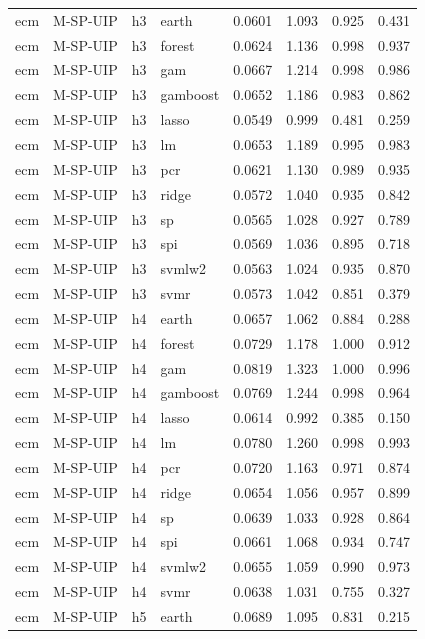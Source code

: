 \begin{ThreePartTable}
\begin{longtable}[t]{llclcccc}
\addlinespace
ecm & M-SP-UIP & h3 & earth & 0.0601 & 1.093 & 0.925 & 0.431\\
ecm & M-SP-UIP & h3 & forest & 0.0624 & 1.136 & 0.998 & 0.937\\
ecm & M-SP-UIP & h3 & gam & 0.0667 & 1.214 & 0.998 & 0.986\\
ecm & M-SP-UIP & h3 & gamboost & 0.0652 & 1.186 & 0.983 & 0.862\\
ecm & M-SP-UIP & h3 & lasso & 0.0549 & 0.999 & 0.481 & 0.259\\
ecm & M-SP-UIP & h3 & lm & 0.0653 & 1.189 & 0.995 & 0.983\\
ecm & M-SP-UIP & h3 & pcr & 0.0621 & 1.130 & 0.989 & 0.935\\
ecm & M-SP-UIP & h3 & ridge & 0.0572 & 1.040 & 0.935 & 0.842\\
ecm & M-SP-UIP & h3 & sp & 0.0565 & 1.028 & 0.927 & 0.789\\
ecm & M-SP-UIP & h3 & spi & 0.0569 & 1.036 & 0.895 & 0.718\\
ecm & M-SP-UIP & h3 & svmlw2 & 0.0563 & 1.024 & 0.935 & 0.870\\
ecm & M-SP-UIP & h3 & svmr & 0.0573 & 1.042 & 0.851 & 0.379\\
\addlinespace
ecm & M-SP-UIP & h4 & earth & 0.0657 & 1.062 & 0.884 & 0.288\\
ecm & M-SP-UIP & h4 & forest & 0.0729 & 1.178 & 1.000 & 0.912\\
ecm & M-SP-UIP & h4 & gam & 0.0819 & 1.323 & 1.000 & 0.996\\
ecm & M-SP-UIP & h4 & gamboost & 0.0769 & 1.244 & 0.998 & 0.964\\
ecm & M-SP-UIP & h4 & lasso & 0.0614 & 0.992 & 0.385 & 0.150\\
ecm & M-SP-UIP & h4 & lm & 0.0780 & 1.260 & 0.998 & 0.993\\
ecm & M-SP-UIP & h4 & pcr & 0.0720 & 1.163 & 0.971 & 0.874\\
ecm & M-SP-UIP & h4 & ridge & 0.0654 & 1.056 & 0.957 & 0.899\\
ecm & M-SP-UIP & h4 & sp & 0.0639 & 1.033 & 0.928 & 0.864\\
ecm & M-SP-UIP & h4 & spi & 0.0661 & 1.068 & 0.934 & 0.747\\
ecm & M-SP-UIP & h4 & svmlw2 & 0.0655 & 1.059 & 0.990 & 0.973\\
ecm & M-SP-UIP & h4 & svmr & 0.0638 & 1.031 & 0.755 & 0.327\\
\addlinespace
ecm & M-SP-UIP & h5 & earth & 0.0689 & 1.095 & 0.831 & 0.215\\

\end{longtable}
\end{ThreePartTable}
